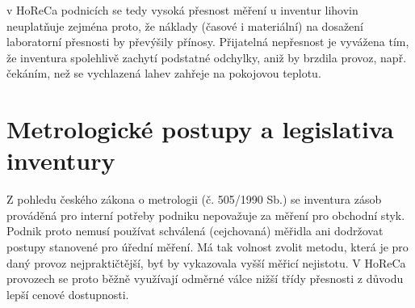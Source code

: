 %
%
%
%	
v HoReCa podnicích se tedy vysoká přesnost měření u inventur lihovin neuplatňuje zejména proto, že náklady (časové i materiální) na dosažení laboratorní přesnosti by převýšily přínosy. Přijatelná nepřesnost je vyvážena tím, že inventura spolehlivě zachytí podstatné odchylky, aniž by brzdila provoz, např. čekáním, než se vychlazená lahev zahřeje na pokojovou teplotu.

%

\section{Metrologické postupy a legislativa inventury}
\label{sec:metrologie}
Z pohledu českého zákona o metrologii (č. 505/1990 Sb.) se inventura zásob prováděná pro interní potřeby podniku nepovažuje za měření pro obchodní styk. Podnik proto nemusí používat schválená (cejchovaná) měřidla ani dodržovat postupy stanovené pro úřední měření. Má tak volnost zvolit metodu, která je pro daný provoz nejpraktičtější, byť by vykazovala vyšší měřicí nejistotu. V HoReCa provozech se proto běžně využívají odměrné válce nižší třídy přesnosti z důvodu lepší cenové dostupnosti.

